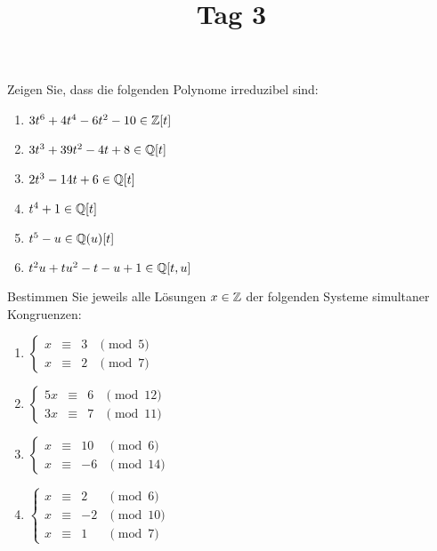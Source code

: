 \documentclass[a4paper, 10pt]{scrartcl}
\title{Tag 3}
\author{}
\date{}
\begin{document}
\begin{question}
  Zeigen Sie, dass die folgenden Polynome irreduzibel sind:
  \begin{enumerate}
    \item
      $3t^6 + 4t^4 - 6t^2 - 10 \in \mathbb{Z}[t]$
    \item
      $3t^3 + 39t^2 - 4t + 8 \in \mathbb{Q}[t]$
    \item
      $2t^3 - 14t + 6 \in \mathbb{Q}[t]$
    \item
      $t^4 + 1 \in \mathbb{Q}[t]$
    \item
      $t^5 - u \in \mathbb{Q}(u)[t]$
    \item
      $t^2 u + tu^2 - t - u + 1 \in \mathbb{Q}[t,u]$
  \end{enumerate}
\end{question}

\begin{question}
  Bestimmen Sie jeweils alle Lösungen $x \in \mathbb{Z}$ der folgenden Systeme simultaner Kongruenzen:
  \begin{enumerate}
    \item
      $
        \left\{
          \begin{array}{ccrl}
            x &\equiv& 3 & \pmod{5}  \\
            x &\equiv& 2 & \pmod{7}
          \end{array}
        \right.
      $
    \item
      $
        \left\{
          \begin{array}{ccrl}
            5x &\equiv& 6 & \pmod{12}  \\
            3x &\equiv& 7 & \pmod{11}
          \end{array}
        \right.
      $
    \item
      $
        \left\{
          \begin{array}{ccrl}
            x &\equiv& 10 & \pmod{6}  \\
            x &\equiv& -6 & \pmod{14}
          \end{array}
        \right.
      $
    \item
      $
        \left\{
          \begin{array}{ccrl}
            x &\equiv&  2 & \pmod{6}  \\
            x &\equiv& -2 & \pmod{10} \\
            x &\equiv&  1 & \pmod{7}
          \end{array}
        \right.
      $
  \end{enumerate}
\end{question}
\end{document}
